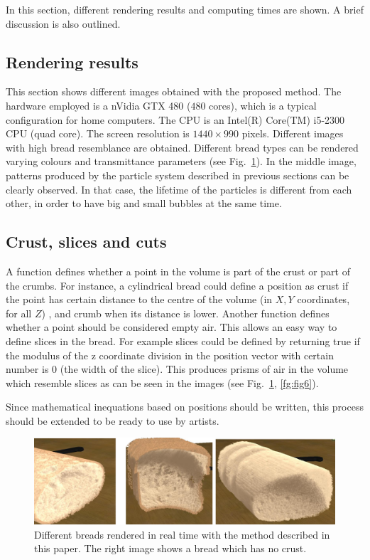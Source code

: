\documentclass[oneside,a4paper,spanish,links]{amca}
\begin{document}
In this section, different rendering results and computing times are shown. A brief discussion is also outlined.

\subsection{Rendering results}

This section shows different images obtained with the proposed
method. The hardware employed is a nVidia GTX 480 ($480$ cores), which
is a typical configuration for home computers. The CPU is an Intel(R)
Core(TM) i5-2300 CPU (quad core). The screen resolution is
$1440\times990$ pixels. Different images with high bread resemblance
are obtained. Different bread types can be rendered varying colours
and transmittance parameters (see Fig.~\ref{fg:fig5}). In the middle
image, patterns produced by the particle system described in previous
sections can be clearly observed. In that case, the lifetime of the
particles is different from each other, in order to have big and small
bubbles at the same time. 

\subsection{Crust, slices and cuts}
A function defines whether a point in the volume is part of the crust
or part of the crumbs. For instance, a cylindrical bread could define
a position as crust if the point has certain distance to the centre of
the volume (in $X,Y$ coordinates, for all $Z$) , and crumb when its
distance is lower. Another function defines whether a point should be
considered empty air. This allows an easy way to define slices in the
bread. For example slices could be defined by returning true if the
modulus of the z coordinate division in the position vector with
certain number is $0$ (the width of the slice).  This produces prisms
of air in the volume which resemble slices as can be seen in the
images (see Fig.~\ref{fg:fig5}, \ref{fg:fig6}).

Since mathematical inequations based on positions should be written, this process should be extended to be ready to use by artists.

\begin{figure}[htb!]
  \centerline{\includegraphics[scale=0.3]{fig5}}
  \caption{Different breads rendered in real time with the method described in this paper. The right image shows a bread which has no crust. }
  \label{fg:fig5}
\end{figure}
\end{document}
